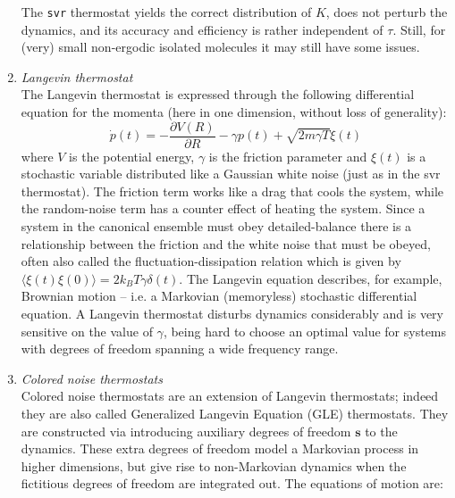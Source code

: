 \documentclass[a4paper,11pt]{scrartcl}
\begin{document}
\begin{enumerate}
The \texttt{svr} thermostat yields the correct distribution of $K$, 
does not perturb the dynamics,
and its accuracy and efficiency is rather independent of $\tau$. Still, for (very) small non-ergodic isolated molecules it may still have some issues.



\item \textit{Langevin thermostat}\cite{tuckerman} \\

The Langevin thermostat is expressed through the following differential equation for the momenta (here in one dimension, without loss of generality):
\begin{equation}
 \dot{p}(t) =  -\frac{\partial V\left(R\right)}{\partial R} -\gamma p(t) + \sqrt{2m\gamma T}\xi(t)
\end{equation}
\noindent where $V$ is the potential energy, $\gamma$ is the friction parameter and $\xi(t)$ is a stochastic variable distributed like a Gaussian white noise (just as in the svr thermostat). The friction term works like a drag that cools the system, while the random-noise term has a counter effect of heating the system.
Since a system in the canonical ensemble must obey detailed-balance there is a relationship between the friction and the white noise that must be obeyed, often also called the fluctuation-dissipation relation which is given by $\langle\xi(t) \xi(0) \rangle= 2 k_B T \gamma \delta(t)$. The Langevin equation describes, for example, Brownian motion -- i.e. a  Markovian (memoryless) stochastic differential equation. A Langevin thermostat disturbs dynamics considerably and is very sensitive on the value of $\gamma$, being hard to choose an optimal value for systems with degrees of freedom spanning a wide frequency range. 


\item \textit{Colored noise thermostats} \cite{ceriotti10}\\

Colored noise thermostats are an extension of Langevin thermostats; indeed they are also called Generalized Langevin Equation (GLE) thermostats.
They are constructed via introducing auxiliary degrees of freedom ${\textbf{s}}$ to the dynamics. These extra degrees of freedom model a Markovian process in higher dimensions, but give rise to non-Markovian dynamics when the fictitious degrees of freedom are integrated out. The equations of motion are:


\end{enumerate}
\end{document}
